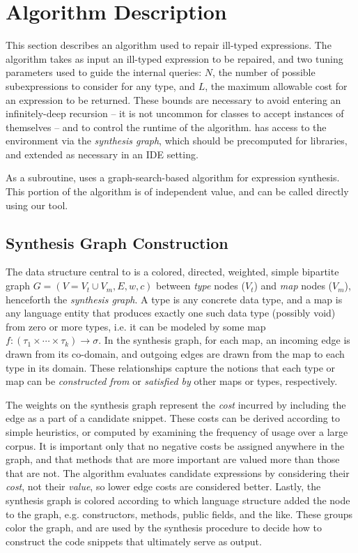 \section{Algorithm Description}

This section describes an algorithm used to repair ill-typed expressions. The algorithm takes as input an ill-typed expression to be repaired, and two tuning parameters used to guide the internal queries: $N$, the number of possible subexpressions to consider for any type, and $L$, the maximum allowable cost for an expression to be returned. These bounds are necessary to avoid entering an infinitely-deep recursion -- it is not uncommon for classes to accept instances of themselves -- and to control the runtime of the algorithm. \ourTool has access to the environment via the \textit{synthesis graph}, which should be precomputed for libraries, and extended as necessary in an IDE setting.

As a subroutine, \ourTool uses a graph-search-based algorithm for expression synthesis. This portion of the algorithm is of independent value, and can be called directly using our tool.

\subsection{Synthesis Graph Construction}

The data structure central to \ourTool is a colored, directed, weighted, simple bipartite graph $G = (V = V_t \cup V_m, E, w, c)$ between \textit{type} nodes ($V_t$) and \textit{map} nodes ($V_m$), henceforth the \textit{synthesis graph}. A type is any concrete data type, and a map is any language entity that produces exactly one such data type (possibly void) from zero or more types, i.e. it can be modeled by some map $f : (\tau_1 \times \cdots \times \tau_k) \to \sigma$. In the synthesis graph, for each map, an incoming edge is drawn from its co-domain, and outgoing edges are drawn from the map to each type in its domain. These relationships capture the notions that each type or map can be \textit{constructed from} or \textit{satisfied by} other maps or types, respectively.

The weights on the synthesis graph represent the \textit{cost} incurred by including the edge as a part of a candidate snippet. These costs can be derived according to simple heuristics, or computed by examining the frequency of usage over a large corpus. It is important only that no negative costs be assigned anywhere in the graph, and that methods that are more important are valued more than those that are not. The algorithm evaluates candidate expressions by considering their \textit{cost}, not their \textit{value}, so lower edge costs are considered better. Lastly, the synthesis graph is colored according to which language structure added the node to the graph, e.g. constructors, methods, public fields, and the like. These groups color the graph, and are used by the synthesis procedure to decide how to construct the code snippets that ultimately serve as output.

